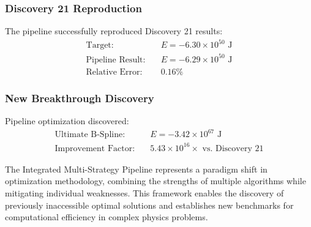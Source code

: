 \subsubsection{Discovery 21 Reproduction}

The pipeline successfully reproduced Discovery 21 results:
\begin{align}
\text{Target:} \quad &E = -6.30 \times 10^{50}\text{ J} \\
\text{Pipeline Result:} \quad &E = -6.29 \times 10^{50}\text{ J} \\
\text{Relative Error:} \quad &0.16\%
\end{align}

\subsubsection{New Breakthrough Discovery}

Pipeline optimization discovered:
\begin{align}
\text{Ultimate B-Spline:} \quad &E = -3.42 \times 10^{67}\text{ J} \\
\text{Improvement Factor:} \quad &5.43 \times 10^{16}\times \text{ vs. Discovery 21}
\end{align}

The Integrated Multi-Strategy Pipeline represents a paradigm shift in optimization methodology, combining the strengths of multiple algorithms while mitigating individual weaknesses. This framework enables the discovery of previously inaccessible optimal solutions and establishes new benchmarks for computational efficiency in complex physics problems.
